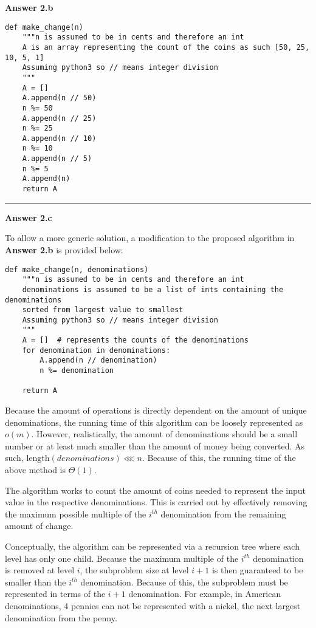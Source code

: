 \documentclass{article}
\begin{document}


\textbf{Answer 2.b}
\begin{verbatim}
def make_change(n)
    """n is assumed to be in cents and therefore an int
    A is an array representing the count of the coins as such [50, 25, 10, 5, 1]
    Assuming python3 so // means integer division
    """
    A = []
    A.append(n // 50)
    n %= 50
    A.append(n // 25)
    n %= 25
    A.append(n // 10)
    n %= 10
    A.append(n // 5)
    n %= 5
    A.append(n)
    return A
\end{verbatim}
\rule{\textwidth}{.2pt}

\textbf{Answer 2.c}

To allow a more generic solution, a modification to the proposed algorithm in 
\textbf{Answer 2.b} is provided below: 

\begin{verbatim}
def make_change(n, denominations)
    """n is assumed to be in cents and therefore an int
    denominations is assumed to be a list of ints containing the denominations 
    sorted from largest value to smallest
    Assuming python3 so // means integer division
    """
    A = []  # represents the counts of the denominations
    for denomination in denominations:
        A.append(n // denomination)
        n %= denomination

    return A
\end{verbatim}

Because the amount of operations is directly dependent on the amount of unique
denominations, the running time of this algorithm can be loosely represented as 
$o(m)$. However, realistically, the amount of denominations should
be a small number or at least much smaller than the amount of money being 
converted. As such, $\text{length}(denominations) \lll n$. Because of this, the 
running time of the above method is $\Theta(1)$. 

The algorithm works to count the amount of coins
needed to represent the input value in the respective denominations. This is 
carried out by effectively removing the maximum possible multiple of the $i^{th}$
denomination from the remaining amount of change. 

Conceptually, the algorithm can be represented via a recursion tree where each
level has only one child. Because the maximum multiple of the $i^{th}$ 
denomination is removed at level $i$, the subproblem size at level $i+1$ is then
guaranteed to be smaller than the $i^{th}$ denomination. Because of this, the 
subproblem must be represented in terms of the $i+1$ denomination. For example, 
in American denominations, 4 pennies can not be represented with a nickel, the 
next largest denomination from the penny. 
\end{document}
